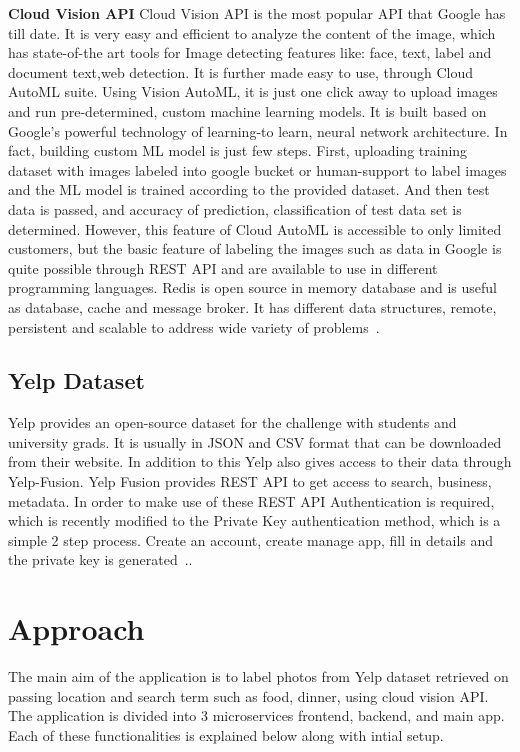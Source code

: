 \item \textbf{Cloud Vision API} Cloud Vision API is the most popular
  API that Google has till date. It is very easy and efficient to
  analyze the content of the image, which has state-of-the art tools
  for Image detecting features like: face, text, label and document
  text,web detection.  It is further made easy to use, through Cloud
  AutoML suite. Using Vision AutoML, it is just one click away to
  upload images and run pre-determined, custom machine learning
  models. It is built based on Google’s powerful technology of
  learning-to learn, neural network architecture. In fact, building
  custom ML model is just few steps. First, uploading training dataset
  with images labeled into google bucket or human-support to label
  images and the ML model is trained according to the provided
  dataset. And then test data is passed, and accuracy of prediction,
  classification of test data set is determined. However, this feature
  of Cloud AutoML is accessible to only limited customers, but the
  basic feature of labeling the images such as data in Google is quite
  possible through REST API and are available to use in different
  programming languages.  Redis is open source in memory database and
  is useful as database, cache and message broker. It has different
  data structures, remote, persistent and scalable to address wide
  variety of problems~\cite{hid-sp18-602-cloud-vision}.

\subsection{Yelp Dataset}
Yelp provides an open-source dataset for the challenge with students
and university grads. It is usually in JSON and CSV format that can be
downloaded from their website. In addition to this Yelp also gives
access to their data through Yelp-Fusion. Yelp Fusion provides REST
API to get access to search, business, metadata. In order to make use
of these REST API Authentication is required, which is recently
modified to the Private Key authentication method, which is a simple 2
step process. Create an account, create manage app, fill in details
and the private key is generated~\cite{hid-sp18-602-yelp}..

\section{Approach}
The main aim of the application is to label photos from Yelp dataset
retrieved on passing location and search term such as food, dinner,
using cloud vision API. The application is divided into 3
microservices frontend, backend, and main app. Each of these
functionalities is explained below along with intial setup.

